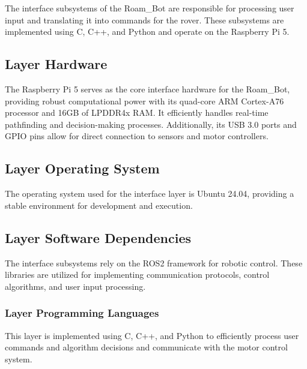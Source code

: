 The interface subsystems of the Roam\_Bot are responsible for processing user input and translating it into commands for the rover. These subsystems are implemented using C, C++, and Python and operate on the Raspberry Pi 5.


\subsection{Layer Hardware}
The Raspberry Pi 5 serves as the core interface hardware for the Roam\_Bot, providing robust computational power with its quad-core ARM Cortex-A76 processor and 16GB of LPDDR4x RAM. It efficiently handles real-time pathfinding and decision-making processes. Additionally, its USB 3.0 ports and GPIO pins allow for direct connection to sensors and motor controllers.

\subsection{Layer Operating System}
The operating system used for the interface layer is Ubuntu 24.04, providing a stable environment for development and execution.

\subsection{Layer Software Dependencies}
The interface subsystems rely on the ROS2 framework for robotic control. These libraries are utilized for implementing communication protocols, control algorithms, and user input processing.

\subsubsection{Layer Programming Languages}
This layer is implemented using C, C++, and Python to efficiently process user commands and algorithm decisions and communicate with the motor control system.


